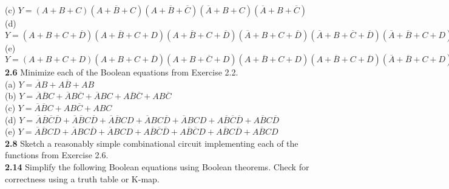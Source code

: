 \documentclass[12pt,a4paper]{report}
\begin{document}
\begin{normalsize}
(c) $ Y = (A + B + C) (A + \overline{B} + C) (A + \overline{B} + \overline{C}) (\overline{A} + B + C) (\overline{A} + B + \overline{C}) $ \\

(d) $ Y = (A + B + C + \overline{D}) (A + \overline{B} + C + D) (A + \overline{B} + C + \overline{D}) (\overline{A} + B + C + \overline{D}) (\overline{A} + B + \overline{C} + \overline{D}) (\overline{A} + \overline{B} + C + D) (\overline{A} + \overline{B} + C + \overline{D}) (\overline{A} + \overline{B} + \overline{C} + D) (\overline{A} + \overline{B} + \overline{C} + \overline{D}) $ \\

(e) $ Y = (A + B + C + D) (A + B + C + \overline{D}) (A + B + \overline{C} + D) (A + \overline{B} + C + D) (A + \overline{B} + C + \overline{D}) (\overline{A} + \overline{B} + C + D) (\overline{A} + \overline{B} + C + \overline{D}) (\overline{A} + \overline{B} + \overline{C} + D) (\overline{A} + \overline{B} + \overline{C} + \overline{D}) $ \\

\textbf{2.6} Minimize each of the Boolean equations from Exercise 2.2. \\
(a) $ Y = \overline{A}B + A\overline{B} + AB $ \\

(b) $ Y = \overline{A}\overline{B}C + \overline{A}B\overline{C} + \overline{A}BC + A\overline{B}\overline{C} + AB\overline{C}$ \\

(c) $ Y = \overline{A}\overline{B}C + AB\overline{C} + ABC $ \\

(d) $ Y = \overline{A}\overline{B}\overline{C}\overline{D} + \overline{A}\overline{B}C\overline{D} + \overline{A}\overline{B}CD + \overline{A}BC\overline{D} + \overline{A}BCD + A\overline{B}\overline{C}\overline{D} + A\overline{B}C\overline{D} $ \\

(e) $ Y = \overline{A}\overline{B}CD + \overline{A}BC\overline{D} + \overline{A}BCD + A\overline{B}\overline{C}\overline{D} + A\overline{B}\overline{C}D + A\overline{B}C\overline{D} + A\overline{B}CD $ \\


\textbf{2.8} Sketch a reasonably simple combinational circuit implementing each of the functions from Exercise 2.6. \\

\textbf{2.14} Simplify the following Boolean equations using Boolean theorems. Check for correctness using a truth table or K-map. \\


\end{normalsize}
\end{document}
